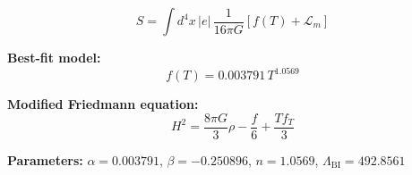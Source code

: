 
\begin{equation}
  S = \int d^4x \, |e| \, \frac{1}{16\pi G} \left[ f(T) + \mathcal{L}_m \right]
\end{equation}

\textbf{Best-fit model:}
\begin{equation}
  f(T) = 0.003791 \, T^{1.0569}
\end{equation}

\textbf{Modified Friedmann equation:}
\begin{equation}
  H^2 = \frac{8\pi G}{3} \rho - \frac{f}{6} + \frac{T f_T}{3}
\end{equation}

\textbf{Parameters:}
$\alpha = 0.003791$, \quad
$\beta = -0.250896$, \quad
$n = 1.0569$, \quad
$\Lambda_{\text{BI}} = 492.8561$